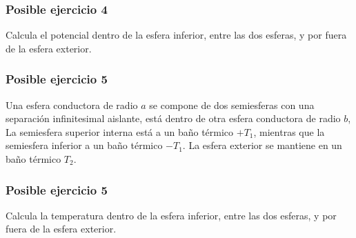 \begin{frame}
\frametitle{Posible ejercicio 4}
\begin{figure}
    \centering
    
\end{figure}
\fontsize{12}{12}\selectfont
Calcula el potencial dentro de la esfera inferior, entre las dos esferas, y por fuera de la esfera exterior.
\end{frame}
\begin{frame}
\frametitle{Posible ejercicio 5}
Una esfera conductora de radio $a$ se compone de dos semiesferas con una separación infinitesimal aislante, está dentro de otra esfera conductora de radio $b$, 
\\
\bigskip
La semiesfera superior interna está a un baño térmico $+T_{1}$, mientras que la semiesfera inferior a un baño térmico $-T_{1}$. La esfera exterior se mantiene en un baño térmico $T_{2}$.
\end{frame}
\begin{frame}
\frametitle{Posible ejercicio 5}
\begin{figure}
    \centering
    
\end{figure}
\fontsize{12}{12}\selectfont
Calcula la temperatura dentro de la esfera inferior, entre las dos esferas, y por fuera de la esfera exterior.
\end{frame}
    

